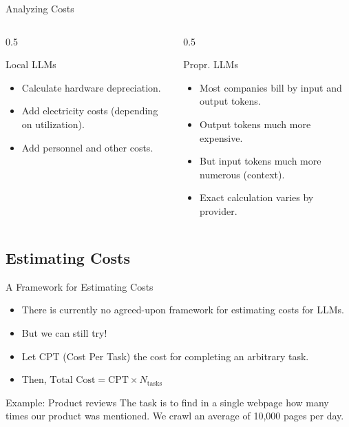 \documentclass[24pt]{beamer}
\begin{document}
\begin{frame}{Analyzing Costs}
	\begin{columns}
		\begin{column}{0.5\textwidth}
			\begin{block}{Local LLMs}
				\begin{itemize}
					\item Calculate hardware depreciation.
					\item Add electricity costs (depending on utilization).
					\item Add personnel and other costs.
				\end{itemize}
			\end{block}
		\end{column}
		\begin{column}{0.5\textwidth}
			\begin{block}{Propr. LLMs}
				\begin{itemize}
					\item Most companies bill by \alert{input} and \alert{output} tokens.
					\item Output tokens much more \alert{expensive}.
					\item But input tokens much more \alert{numerous} (context).
					\item Exact calculation varies by provider.
				\end{itemize}
			\end{block}
		\end{column}
	\end{columns}
\end{frame}


\subsection{Estimating Costs}

\begin{frame}
	\sectionpage
	\subsectionpage
\end{frame}

\begin{frame}{A Framework for Estimating Costs}
	\begin{itemize}
		\item There is currently no agreed-upon framework for estimating costs for LLMs.
		\item But we can still try!
		\item Let CPT (Cost Per Task) the cost for completing an arbitrary task.
		\item Then, $\text{Total Cost} = \text{CPT}  \times N_{\text{tasks}}$
	\end{itemize}
	
	\begin{exampleblock}{Example: Product reviews}
		The task is to find in a single webpage how many times our product was mentioned.
		We crawl an average of 10{,}000 pages per day.
	\end{exampleblock}
\end{frame}
\end{document}
